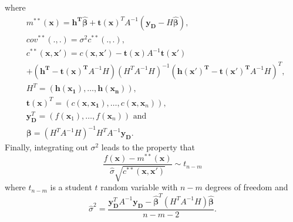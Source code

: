 \documentclass{article}
\newcommand{\simulator}{f}
\newcommand{\inputVec}{\mathbf{x}}
\newcommand{\outputVec}{\mathbf{y}}
\newcommand{\basisFuncs}{\mathbf{h}}
\newcommand{\basisCoeffs}{\mathbf{\beta}}
\newcommand{\basisCoeffsEst}{\hat{\mathbf{\beta}}}
\newcommand{\cov}{cov}
\newcommand{\var}{\sigma^2}
\newcommand{\varEst}{\hat{\sigma}^2}
\newcommand{\numBasisFuncs}{m}
\newcommand{\corr}{c}
\newcommand{\designOutput}{\outputVec_\design}
\newcommand{\design}{\mathbf{D}}
\newcommand{\corrMatrix}{A}
\newcommand{\numDPs}{n}
\newcommand{\SDEst}{\hat{\sigma}}
\begin{document}
where 
\begin{align}
    & m^{**}(\inputVec) = \mathbf{\basisFuncs^T \basisCoeffsEst} + \mathbf{t(\inputVec)}^T \corrMatrix^{-1} (\designOutput - H\basisCoeffsEst),\label{eq:post2-mean} \\
    & \cov^{**}(.,.) = \var \corr^{**}(.,.),\nonumber \\
    & \corr^{**}(\inputVec,\inputVec') = \corr(\inputVec,\inputVec') - \mathbf{t(\inputVec)} \corrMatrix^{-1} \mathbf{t(\inputVec')} \label{eq:post2-cov} \\
    & + (\mathbf{\basisFuncs^T - t(\inputVec)^T}\corrMatrix^{-1}H) (H^T \corrMatrix^{-1} H)^{-1}(\mathbf{\basisFuncs(\inputVec')^T - t(\inputVec')^T}\corrMatrix^{-1}H)^T, \nonumber\\
    & H^T = (\mathbf{\basisFuncs(\inputVec_1),\dots,\basisFuncs(\inputVec_\numDPs)}),\nonumber\\
    & \mathbf{t(\inputVec)}^T = \left(\corr(\mathbf{\inputVec,\inputVec_1}),\dots,\corr(\inputVec,\inputVec_\numDPs) \right),\nonumber\\
    & \designOutput^T = \left(\simulator(\inputVec_1),\dots,\simulator(\inputVec_\numDPs) \right) \text{ and} \nonumber\\
    & \basisCoeffs = (H^T \corrMatrix^{-1} H)^{-1} H^T \corrMatrix^{-1} \designOutput. \label{eq:post2-beta}
\end{align}
Finally, integrating out $\var$ leads to the property that
\begin{equation}
    \label{eq:student t}
    \frac{\simulator(\inputVec) - m^{**}(\inputVec)}{\SDEst\sqrt{\corr^{**}(\inputVec,\inputVec')}} \sim t_{\numDPs-\numBasisFuncs}
\end{equation}
where $t_{\numDPs-\numBasisFuncs}$ is a student $t$ random variable with $\numDPs-\numBasisFuncs$ degrees of freedom and 
\begin{equation}
    \label{eq:sigma_sq_hat}
    \varEst = \frac{\designOutput^T \corrMatrix^{-1} \designOutput -\basisCoeffsEst^T (H^T \corrMatrix^{-1} H) \basisCoeffsEst}{\numDPs - \numBasisFuncs - 2}.
\end{equation}
\end{document}
